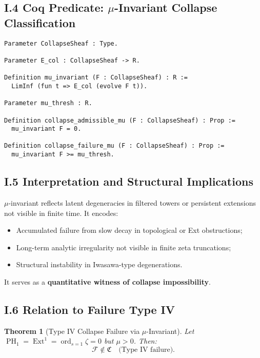 \documentclass[11pt]{article}
\newtheorem{theorem}{Theorem}[section]
\DeclareMathOperator{\Ext}{Ext}
\DeclareMathOperator{\PH}{PH}
\newcommand{\ord}{\operatorname{ord}}
\begin{document}
\subsection*{I.4 Coq Predicate: \(\mu\)-Invariant Collapse Classification}
\begin{lstlisting}[language=Coq]
Parameter CollapseSheaf : Type.

Parameter E_col : CollapseSheaf -> R.

Definition mu_invariant (F : CollapseSheaf) : R :=
  LimInf (fun t => E_col (evolve F t)).

Parameter mu_thresh : R.

Definition collapse_admissible_mu (F : CollapseSheaf) : Prop :=
  mu_invariant F = 0.

Definition collapse_failure_mu (F : CollapseSheaf) : Prop :=
  mu_invariant F >= mu_thresh.
\end{lstlisting}

\subsection*{I.5 Interpretation and Structural Implications}

\(\mu\)-invariant reflects latent degeneracies in filtered towers or persistent extensions not visible in finite time. It encodes:

\begin{itemize}
  \item Accumulated failure from slow decay in topological or Ext obstructions;
  \item Long-term analytic irregularity not visible in finite zeta truncations;
  \item Structural instability in Iwasawa-type degenerations.
\end{itemize}

It serves as a \textbf{quantitative witness of collapse impossibility}.

\subsection*{I.6 Relation to Failure Type IV}

\begin{theorem}[Type IV Collapse Failure via \(\mu\)-Invariant]
\label{thm:type-iv-mu}
Let \( \PH_1 = \Ext^1 = \ord_{s=1} \zeta = 0 \) but \( \mu > 0 \). Then:
\[
\mathcal{F} \notin \mathfrak{C} \quad \text{(Type IV failure)}.
\]
\end{theorem}
\end{document}
